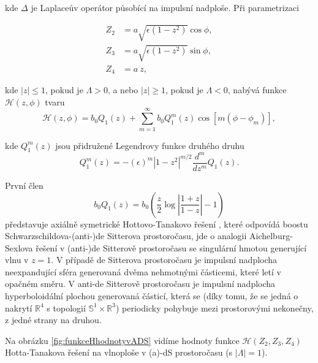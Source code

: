 kde $\Delta$ je Laplaceův operátor působící na impulsní nadploše. Při parametrizaci 

\begin{equation}
    \begin{split}
        Z_2 &= a \sqrt{\epsilon(1-z^2)} \cos \phi,\\
        Z_3 &= a \sqrt{\epsilon(1-z^2)} \sin \phi,\\
        Z_4 &= a~z,
    \end{split}
\end{equation}

kde $\left|z\right| \leq 1$, pokud je $\Lambda > 0$, a nebo $\left|z\right| \geq 1$, pokud je $\Lambda < 0$,
nabývá funkce $\mathcal{H}(z, \phi)$ tvaru
\begin{equation}
    \mathcal{H}(z, \phi) = b_0 Q_1(z) + \sum_{m=1}^\infty b_0 Q_1^m(z) \cos [m(\phi - \phi_m)],
\end{equation}

kde $Q_1^m(z)$ jsou přidružené Legendrovy funkce druhého druhu
\begin{equation}
    Q_1^m(z) = -(\epsilon)^m |1-z^2|^{m/2} \frac{d^m}{dz^m}Q_1(z).
\end{equation}

První člen
\begin{equation}
    b_0 Q_1(z) = b_0 \left(\frac{z}{2} \log \left|\frac{1+z}{1-z}\right| - 1\right)
\end{equation}
představuje axiálně symetrické Hottovo-Tanakovo řešení \cite{Hotta_1993}, které odpovídá boostu Schwarzschildova-(anti-)de Sitterova
prostoročasu, jde o analogii Aichelburg-Sexlova řešení v (anti-)de Sitterově prostoročasu se singulární hmotou generující vlnu v $z=1$. V případě de Sitterova prostoročasu je impulsní nadplocha
neexpandující sféra generovaná dvěma nehmotnými částicemi, které letí v opačném směru. V anti-de Sitterově prostoročasu je impulsní nadplocha hyperboloidální
plochou generovaná částicí, která se (díky tomu, že se jedná o nakrytí $\mathbb{R}^4$ s topologií $\mathbb{S}^1 \times \mathbb{R}^3$) periodicky pohybuje mezi prostorovými nekonečny,
z jedné strany na druhou.

Na obrázku \ref{fig:funkceHhodnotyvADS} vidíme hodnoty funkce $\mathcal{H}(Z_2, Z_3, Z_4)$ Hotta-Tanakova řešení na vlnoploše v (a)-dS prostoročasu (s $|\Lambda | = 1$).

